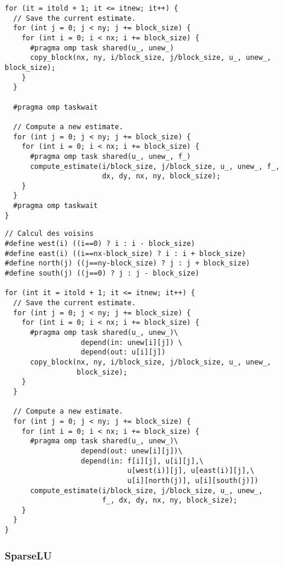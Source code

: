 \begin{lstlisting}[caption=Boucle itérative principale de Jacobi utilisant des tâches avec synchronisation globales,label=lst:kastors:jacobi-task]
for (it = itold + 1; it <= itnew; it++) {
  // Save the current estimate.
  for (int j = 0; j < ny; j += block_size) {
    for (int i = 0; i < nx; i += block_size) {
      #pragma omp task shared(u_, unew_)
      copy_block(nx, ny, i/block_size, j/block_size, u_, unew_, block_size);
    }
  }

  #pragma omp taskwait

  // Compute a new estimate.
  for (int j = 0; j < ny; j += block_size) {
    for (int i = 0; i < nx; i += block_size) {
      #pragma omp task shared(u_, unew_, f_)
      compute_estimate(i/block_size, j/block_size, u_, unew_, f_,
                       dx, dy, nx, ny, block_size);
    }
  }
  #pragma omp taskwait
}
\end{lstlisting}

\begin{lstlisting}[caption=Boucle itérative principale de Jacobi utilisant des tâches avec dépendances,label=lst:kastors:jacobi-taskdep]
// Calcul des voisins
#define west(i) ((i==0) ? i : i - block_size)
#define east(i) ((i==nx-block_size) ? i : i + block_size)
#define north(j) ((j==ny-block_size) ? j : j + block_size)
#define south(j) ((j==0) ? j : j - block_size)

for (int it = itold + 1; it <= itnew; it++) {
  // Save the current estimate.
  for (int j = 0; j < ny; j += block_size) {
    for (int i = 0; i < nx; i += block_size) {
      #pragma omp task shared(u_, unew_)\
                  depend(in: unew[i][j]) \
                  depend(out: u[i][j])
      copy_block(nx, ny, i/block_size, j/block_size, u_, unew_,
                 block_size);
    }
  }

  // Compute a new estimate.
  for (int j = 0; j < ny; j += block_size) {
    for (int i = 0; i < nx; i += block_size) {
      #pragma omp task shared(u_, unew_)\
                  depend(out: unew[i][j])\
                  depend(in: f[i][j], u[i][j],\
                             u[west(i)][j], u[east(i)][j],\
                             u[i][north(j)], u[i][south(j)])
      compute_estimate(i/block_size, j/block_size, u_, unew_,
                       f_, dx, dy, nx, ny, block_size);
    }
  }
}
\end{lstlisting}

\subsubsection{SparseLU}\label{sec:kastors:sparselu}

